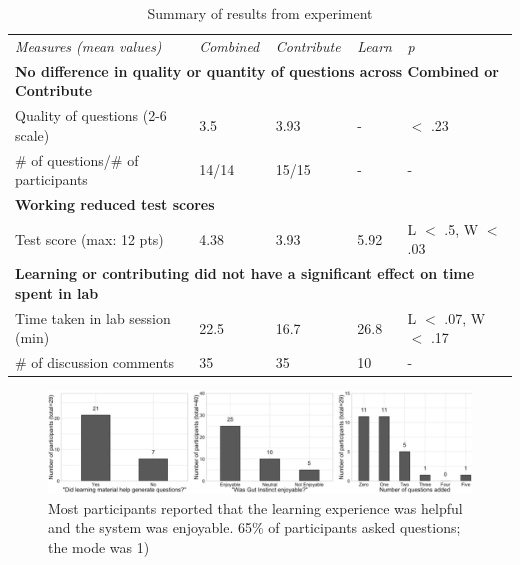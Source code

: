 \vspace{0.25in}
\begin{table}[!ht]
\caption[Summary of results from experiment]{Summary of results from experiment}

\vspace{-0.25in}
\begin{center}
\renewcommand{\arraystretch}{1.5} %
\begin{tabular}{p{1in}p{1in}p{1in}p{1in}p{1.5in}}
\hline
\textit{Measures (mean values)}	& \textit{Combined} &	\textit{Contribute}	& \textit{Learn}	& {\it p} \\
\multicolumn{5}{l}{\bf No difference in quality or quantity of questions across Combined or Contribute}   \\
Quality of questions (2-6 scale)  &	3.5 &	3.93	&-	& $<$ .23\\
\# of questions/\# of participants &	14/14 &	15/15 &	- &	-\\
\multicolumn{2}{l}{\bf  Working reduced test scores}  & & & \\
Test score (max: 12 pts) & 4.38	& 3.93 & 5.92 & L $<$ .5, W $<$ .03 \\
\multicolumn{5}{l}{\bf Learning or contributing did not have a significant effect on time spent in lab }   \\
Time taken in lab session (min) & 22.5 & 16.7 & 26.8 & L $<$ .07, W $<$ .17\\
\# of discussion comments & 35 & 35 & 10 & - \\
\hline
\end{tabular}
\end{center}
\label{tab:gi-results1}
\end{table}

\begin{figure}[h] 
  \centering
  \includegraphics[width=1.0\textwidth]{figures/gutinstinct/gi-9.png}
  \caption[Participants' self-reports]
{Most participants reported that the learning experience was helpful and the system was enjoyable. 65\% of participants asked questions; the mode was 1) }
  \label{fig:gi-9}
\end{figure}

